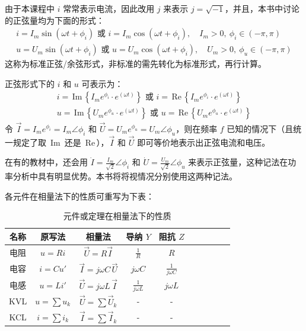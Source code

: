 \documentclass[UTF8]{report}
\def\Im{\,\mathrm{Im}\,}
\def\Re{\,\mathrm{Re}\,}
\theoremstyle{MyLineTheoremStyle} %
\theoremstyle{MyBlockTheoremStyle} %
\theoremstyle{MySubsubsectionStyle} %
\begin{document}
由于本课程中 $i$ 常常表示电流，因此改用 $j$ 来表示 $j = \sqrt{-1}$，并且，本书中讨论的正弦量均为下面的形式：
\begin{gather}
i = I_m \sin (\omega t + \phi_i) \text{\ 或\ } i = I_m \cos (\omega t + \phi_i),\quad I_m > 0,\ \phi_i \in (-\pi, \pi) \\ 
u = U_m \sin (\omega t + \phi_i) \text{\ 或\ } u = U_m \cos (\omega t + \phi_i),\quad U_m > 0,\ \phi_u \in (-\pi, \pi) 
\end{gather}
这称为标准正弦/余弦形式，非标准的需先转化为标准形式，再行计算。

正弦形式下的 $i$ 和 $u$ 可表示为：
\begin{gather}
i = \Im \left\{ I_me^{\phi_i} \cdot e^{(\omega t)} \right\} \text{\ 或\ } i = \Re \left\{ I_me^{\phi_i} \cdot e^{(\omega t)} \right\} \\ 
u = \Im \left\{ U_m e^{\phi_u} \cdot e^{(\omega t)} \right\} \text{\ 或\ } u = \Re \left\{ U_m e^{\phi_u} \cdot e^{(\omega t)} \right\}
\end{gather}
令 $\vec{I} = I_me^{\phi_i} = I_m \angle \phi_i $ 和 $\vec{U} = U_me^{\phi_u} =  U_m \angle \phi_u$，则在频率 $f$ 已知的情况下（且统一规定了取 $\Im$ 还是 $\Re$），$\vec{I}$ 和 $\vec{U}$ 即可等价地表示出正弦电流和电压。

在有的教材中，还会用 $\dot{I} = \frac{I_m}{\sqrt{2}} \angle \phi_i $ 和 $\dot{U} = \frac{U_m}{\sqrt{2}} \angle \phi_u$ 来表示正弦量，这种记法在功率分析中具有明显优势。本书将将视情况分别使用这两种记法。

各元件在相量法下的性质可重写为下表：
\begin{table}[H]\centering
    \caption{元件或定理在相量法下的性质}
    \label{元件在相量法下的性质}
\begin{tabular}{cccccccccc}\toprule
    名称 & 原写法 & 相量法 & 导纳 $Y$ & 阻抗 $Z$  \\
    \midrule
    电阻 & $u = Ri$ & $\vec{U} = R \vec{I}$ & $\frac{1}{R}$ & $R$  \\
    电容 & $i = C u'$ & $\vec{I} = j\omega C \,\vec{U}$ & $j \omega C$ & $\displaystyle \frac{1}{j \omega C}$   \\
    电感 & $u = Li'$ & $\vec{U} = j\omega L \,\vec{I}$ & $\displaystyle \frac{1}{j \omega L}$ & $j \omega L$  \\
    KVL & $u = \sum u_k$ & $\vec{U} = \sum \vec{U}_k$ & - & - \\ 
    KCL & $i = \sum i_k$ & $\vec{I} = \sum \vec{I}_k$ & - & - \\ 
    \bottomrule
\end{tabular}
\end{table}
\end{document}

